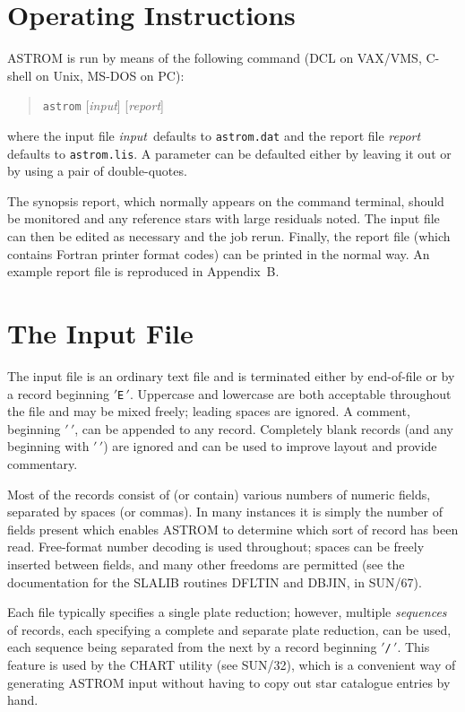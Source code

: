 \section{Operating Instructions}
ASTROM is run by means of the following command (DCL on VAX/VMS,
C-shell on Unix, MS-DOS on PC):
\begin{quote}
 \verb|astrom| [{\it input}] [{\it report}]
\end{quote}
where the input file {\it input}\, defaults to \verb|astrom.dat| and
the report file {\it report}\, defaults to \verb|astrom.lis|.  A
parameter can be defaulted either by leaving it out or
by using a pair of double-quotes.

The synopsis report, which normally appears on the command terminal,
should be monitored and any reference stars with large
residuals noted.  The input file can then be edited as
necessary and the job rerun.  Finally, the report file (which
contains Fortran printer format codes) can
be printed in the normal way.  An example report file is
reproduced in Appendix~B.

\section{The Input File}
The input file is an ordinary text file and is
terminated either by end-of-file or by a record
beginning $'${\tt E}$\,'$.  
Uppercase and lowercase are both acceptable throughout
the file and may be mixed
freely;  leading spaces are ignored.  A comment, beginning
$'${\tt *}$\,'$, can be appended to any record.
Completely blank records (and any
beginning with $'${\tt *}$\,'$) are ignored and can be used to improve
layout and provide commentary.

Most of the records consist of (or contain) various numbers of
numeric fields, separated by spaces (or commas).
In many
instances it is simply the number of fields present which enables
ASTROM to determine which sort of record has been read.
Free-format number decoding is used throughout;  spaces can
be freely inserted between fields, and many other freedoms
are permitted (see the documentation for the SLALIB
routines DFLTIN and DBJIN, in SUN/67).

Each file typically specifies
a single plate reduction;  however, multiple
{\it sequences}\, of records,
each specifying a complete
and separate plate reduction, can be used,
each sequence being separated from the next
by a record beginning
$'${\tt /}$\,'$.  This feature is used by the CHART utility
(see SUN/32), which is a convenient way of generating
ASTROM input without having to copy out star catalogue
entries by hand.

